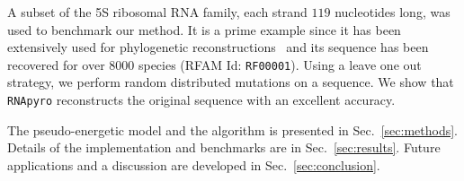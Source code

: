 A subset of the 5S ribosomal RNA family, each strand $119$ nucleotides long,  
was used to benchmark our method.
It is a prime example since it has been extensively used for phylogenetic
reconstructions~\cite{Hori1987} and its sequence has been recovered for over 8000 species
 (RFAM Id: \texttt{RF00001}).
 Using a leave one out strategy, we perform random distributed mutations on a sequence. We show that
\texttt{RNApyro} reconstructs the original sequence with an excellent accuracy.

The pseudo-energetic model and the algorithm is presented in Sec.~\ref{sec:methods}.
Details of the implementation and benchmarks are in Sec.~\ref{sec:results}. 
Future applications and a discussion are developed in Sec.~\ref{sec:conclusion}.
